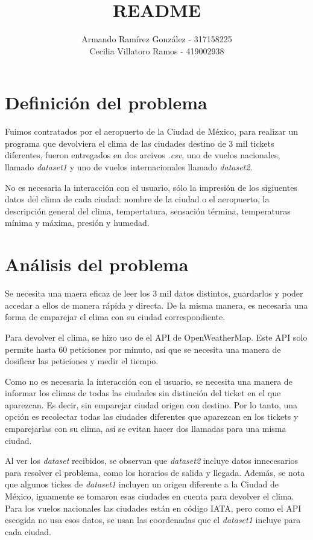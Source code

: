 \documentclass[]{article}
\title{README}
\author{Armando Ramírez González - 317158225 \\ Cecilia Villatoro Ramos 
- 419002938}
\begin{document}
\maketitle

\section{Definición del problema}

Fuimos contratados por el aeropuerto de la Ciudad de México, para realizar 
un programa que devolviera el clima de las ciudades destino de 3 mil tickets 
diferentes, fueron entregados en dos arcivos \emph{.csv}, uno de vuelos 
nacionales, llamado \emph{dataset1} y uno de vuelos internacionales llamado 
\emph{dataset2}. 

No es necesaria la interacción con el usuario, sólo la impresión de los 
sigiuentes datos del clima de cada ciudad: nombre de la ciudad o el 
aeropuerto, la descripción general del clima, tempertatura, sensación términa, 
temperaturas mínima y máxima, presión y humedad.

\section{Análisis del problema}

Se necesita una maera eficaz de leer los 3 mil datos distintos, guardarlos y 
poder accedar a ellos de manera rápida y directa. De la misma manera, es 
necesaria una forma de emparejar el clima con su ciudad correspondiente.

Para devolver el clima, se hizo uso de el API de OpenWeatherMap. Este API
solo permite hasta 60 peticiones por minuto, así que se necesita una 
manera de dosificar las peticiones y medir el tiempo.

Como no es necesaria la interacción con el usuario, se necesita 
una manera de informar los climas de todas las ciudades sin distinción del 
ticket en el que aparezcan. Es decir, sin emparejar ciudad origen con 
destino. Por lo tanto, una opción es recolectar todas las ciudades 
diferentes que aparezcan en los tickets y emparejarlas con su clima, así 
se evitan hacer dos llamadas para una misma ciudad.

Al ver los \emph{dataset} recibidos, se observan que \emph{dataset2} incluye 
datos innecesarios para resolver el problema, como los horarios de salida y 
llegada. Además, se nota que algunos tickes de \emph{dataset1} incluyen un 
origen diferente a la Ciudad de México, iguamente se tomaron esas ciudades 
en cuenta para devolver el clima. Para los vuelos nacionales las ciudades están 
en código IATA, pero como el API escogida no usa esos datos, se usan las 
coordenadas que el \emph{dataset1} incluye para cada ciudad. 
\end{document}
